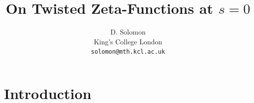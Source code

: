 \documentclass[12pt]{article}
\newcounter{example}[section]
\newcounter{rem}[section]%
\newcommand{\bbC}{\ensuremath{\mathbb{C}}}
\newcommand{\bbQ}{\ensuremath{\mathbb{Q}}}
\newcommand{\bbZ}{\ensuremath{\mathbb{Z}}}
\newcommand{\fa}{\ensuremath{\mathfrak{a}}}
\newcommand{\fP}{\ensuremath{\mathfrak{P}}}
\newcommand{\Gal}{{\rm Gal}}
\newcommand{\ie}{\emph{i.e.}}
\newcommand{\inv}{^{-1}}%
\newcommand{\ndiv}{\nmid}
\newcommand{\rem}{\refstepcounter{rem}\noindent{\sc Remark \therem}}%
\renewcommand{\therem}{\thesection.\arabic{rem}}
\begin{document}
\title{On Twisted Zeta-Functions at $s=0$}
\author{D. Solomon
\\King's College London\\
{\tt solomon@mth.kcl.ac.uk}}
\maketitle
\section{Introduction}
\end{document}
